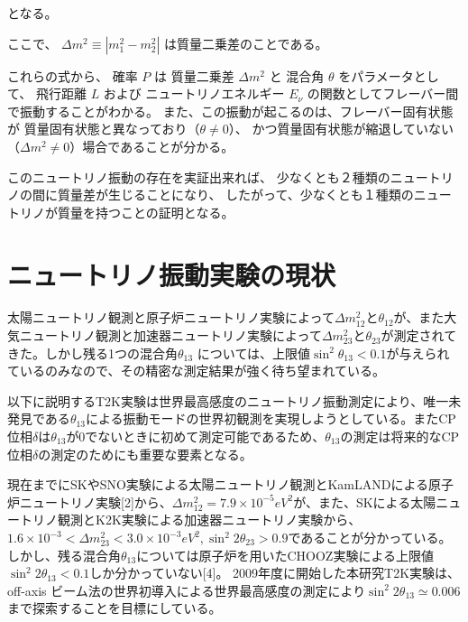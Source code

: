 となる。

ここで、
$\Delta m^{2} \equiv |m_{1}^{2} - m_{2}^{2}|$ は質量二乗差のことである。

これらの式から、
確率 $P$ は
質量二乗差 $\Delta m^{2}$ と
混合角 $\theta$ をパラメータとして、
飛行距離 $L$ および
ニュートリノエネルギー $E_{\nu}$ の関数としてフレーバー間で振動することがわかる。
また、この振動が起こるのは、フレーバー固有状態が
質量固有状態と異なっており（$\theta \neq 0$）、
かつ質量固有状態が縮退していない（$\Delta m^{2} \neq 0$）場合であることが分かる。

このニュートリノ振動の存在を実証出来れば、
少なくとも２種類のニュートリノの間に質量差が生じることになり、
したがって、少なくとも１種類のニュートリノが質量を持つことの証明となる。






\section{ニュートリノ振動実験の現状}

太陽ニュートリノ観測と原子炉ニュートリノ実験によって$\Delta m_{12}^{2}$と$\theta_{12}$が、また大気ニュートリノ観測と加速器ニュートリノ実験によって$\Delta m_{23}^{2}$と$\theta_{23}$が測定されてきた。しかし残る1つの混合角$\theta_{13}$	については、上限値$\sin^{2}\theta_{13}<0.1$が与えられているのみなので、その精密な測定結果が強く待ち望まれている。

以下に説明するT2K実験は世界最高感度のニュートリノ振動測定により、唯一未発見である$\theta_{13}$による振動モードの世界初観測を実現しようとしている。またCP位相$\delta$は$\theta_{13}$が0でないときに初めて測定可能であるため、$\theta_{13}$の測定は将来的なCP位相$\delta$の測定のためにも重要な要素となる。

現在までにSKやSNO実験による太陽ニュートリノ観測とKamLANDによる原子炉ニュートリノ実験[2]から、$\Delta m_{12}^{2}=7.9 \times 10^{-5} eV^{2}$が、また、SKによる太陽ニュートリノ観測とK2K実験による加速器ニュートリノ実験から、$1.6 \times 10^{-3} < \Delta m_{23}^{2} < 3.0 \times 10^{-3} eV^{2}, \sin^{2}2\theta_{23} > 0.9$であることが分かっている。しかし、残る混合角$\theta_{13}$については原子炉を用いたCHOOZ実験による上限値$\sin^{2}2\theta_{13} < 0.1$しか分かっていない[4]。 2009年度に開始した本研究T2K実験は、off-axis ビーム法の世界初導入による世界最高感度の測定により$\sin^{2}2\theta_{13} \simeq 0.006$まで探索することを目標にしている。
\fi

